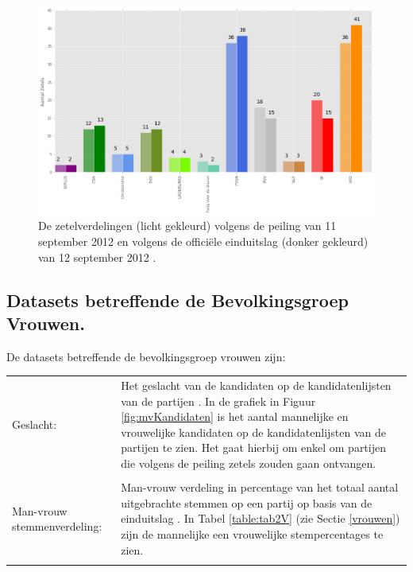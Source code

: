 \begin{figure}[H]
\centering
	\includegraphics[width=\linewidth]{peiling_zetels_landelijk.png}

			\caption{De zetelverdelingen (licht gekleurd) volgens de peiling van 11 september 2012 \citep{IPSOS} en volgens de offici\"{e}le einduitslag (donker gekleurd) van 12 september 2012 \citep{Kiesraad_databank}.}

\label{fig:pzL}
\end{figure}











\subsection{Datasets betreffende de Bevolkingsgroep Vrouwen.}
De datasets betreffende de bevolkingsgroep vrouwen zijn:\\




\noindent\begin{tabularx}{\textwidth}{LI}
Geslacht: & Het geslacht van de kandidaten op de kandidatenlijsten van de partijen \cite{Kiesraad_kandidatenlijsten}. In de grafiek in Figuur \ref{fig:mvKandidaten} is het aantal mannelijke en vrouwelijke kandidaten op de kandidatenlijsten van de partijen te zien. Het gaat hierbij om enkel om partijen die volgens de peiling zetels zouden gaan ontvangen.\\
\\
Man-vrouw stemmenverdeling: & Man-vrouw verdeling in percentage van het totaal aantal uitgebrachte stemmen op een partij op basis van de einduitslag \citep{IPSOS}. In Tabel \ref{table:tab2V} (zie Sectie \ref{vrouwen}) zijn de mannelijke een vrouwelijke stempercentages te zien. \\
\\  
\end{tabularx}

